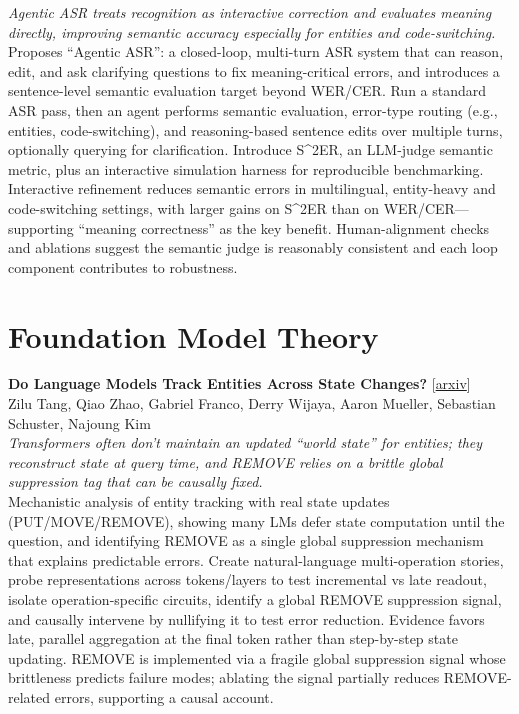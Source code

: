 \documentclass[12pt,letterpaper]{article}
\begin{document}
{\small\textit{Agentic ASR treats recognition as interactive correction and evaluates meaning directly, improving semantic accuracy especially for entities and code-switching.}}\\[1pt]
{\footnotesize Proposes ``Agentic ASR'': a closed-loop, multi-turn ASR system that can reason, edit, and ask clarifying questions to fix meaning-critical errors, and introduces a sentence-level semantic evaluation target beyond WER/CER. Run a standard ASR pass, then an agent performs semantic evaluation, error-type routing (e.g., entities, code-switching), and reasoning-based sentence edits over multiple turns, optionally querying for clarification. Introduce S\textasciicircum{}2ER, an LLM-judge semantic metric, plus an interactive simulation harness for reproducible benchmarking. Interactive refinement reduces semantic errors in multilingual, entity-heavy and code-switching settings, with larger gains on S\textasciicircum{}2ER than on WER/CER---supporting ``meaning correctness'' as the key benefit. Human-alignment checks and ablations suggest the semantic judge is reasonably consistent and each loop component contributes to robustness.}

\medskip


\section*{Foundation Model Theory}

{\small\textbf{Do Language Models Track Entities Across State Changes?}} {\scriptsize[\href{https://arxiv.org/abs/2605.30233}{arxiv}]}\\
{\scriptsize Zilu Tang, Qiao Zhao, Gabriel Franco, Derry Wijaya, Aaron Mueller, Sebastian Schuster, Najoung Kim}\\

{\small\textit{Transformers often don't maintain an updated ``world state'' for entities; they reconstruct state at query time, and REMOVE relies on a brittle global suppression tag that can be causally fixed.}}\\[1pt]
{\footnotesize Mechanistic analysis of entity tracking with real state updates (PUT/MOVE/REMOVE), showing many LMs defer state computation until the question, and identifying REMOVE as a single global suppression mechanism that explains predictable errors. Create natural-language multi-operation stories, probe representations across tokens/layers to test incremental vs late readout, isolate operation-specific circuits, identify a global REMOVE suppression signal, and causally intervene by nullifying it to test error reduction. Evidence favors late, parallel aggregation at the final token rather than step-by-step state updating. REMOVE is implemented via a fragile global suppression signal whose brittleness predicts failure modes; ablating the signal partially reduces REMOVE-related errors, supporting a causal account.}
\end{document}
